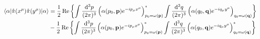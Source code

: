 \begin{lemma}
	\begin{equation}
		\begin{split}
			\expval{\hat\pi(x^\mu)\hat\pi(y^\mu)}{\alpha}
			&=
			\frac{1}{2}
			\operatorname{\operatorname{Re}}\left\{
				\int\frac{\dd[3]{p}}{(2\pi)^3}
				\left(
					\alpha(p_0,\vb{p})
					e^{-ip_\mu x^\mu}
				\right)^*_{p_0=\omega(\vb{p})}
				\int\frac{\dd[3]{q}}{(2\pi)^3}
				\left(
					\alpha(q_0,\vb{q})
					e^{-iq_\mu y^\mu}
				\right)_{q_0=\omega(\vb{q})}			
			\right\}
			\\
			&-
			\frac{1}{2}
			\operatorname{\operatorname{Re}}\left\{
				\int\frac{\dd[3]{p}}{(2\pi)^3}
				\left(
					\alpha(p_0,\vb{p})
					e^{-ip_\mu x^\mu}
				\right)^*_{p_0=\omega(\vb{p})}
				\int\frac{\dd[3]{q}}{(2\pi)^3}
				\left(
					\alpha(q_0,\vb{q})
					e^{-iq_\mu y^\mu}
				\right)^*_{q_0=\omega(\vb{q})}
			\right\}
		\end{split}
	\end{equation}
\end{lemma}
